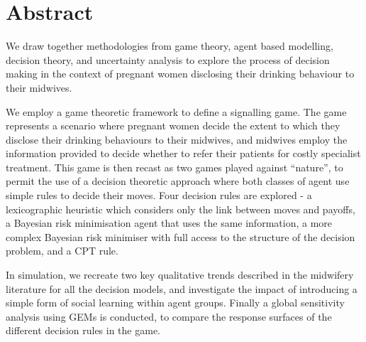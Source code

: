 \begingroup
\let\clearpage\relax
\let\cleardoublepage\relax


\section*{Abstract}

We draw together methodologies from game theory, agent based modelling, decision theory, and uncertainty analysis to explore the process of decision making in the context of pregnant women disclosing their drinking behaviour to their midwives.

We employ a game theoretic framework to define a signalling game. The game represents a scenario where pregnant women decide the extent to which they disclose their drinking behaviours to their midwives, and midwives employ the information provided to decide whether to refer their patients for costly specialist treatment. This game is then recast as two games played against \enquote{nature}, to permit the use of a decision theoretic approach where both classes of agent use simple rules to decide their moves.
Four decision rules are explored - a lexicographic heuristic which considers only the link between moves and payoffs, a Bayesian risk minimisation agent that uses the same information, a more complex Bayesian risk minimiser with full access to the structure of the decision problem, and a \ac{CPT} rule.

In simulation, we recreate two key qualitative trends described in the midwifery literature for all the decision models, and investigate the impact of introducing a simple form of social learning within agent groups.
Finally a global sensitivity analysis using \acp{GEM} is conducted, to compare the response surfaces of the different decision rules in the game.